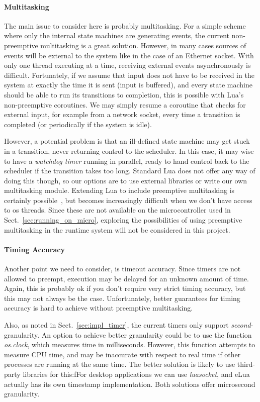 \paragraph{Multitasking} The main issue to consider here is probably multitasking. For a simple scheme where only the internal state machines are generating events, the current non-preemptive multitasking is a great solution. However, in many cases sources of events will be external to the system like in the case of an Ethernet socket. With only one thread executing at a time, receiving external events asynchronously is difficult. Fortunately, if we assume that input does not have to be received in the system at exactly the time it is sent (input is buffered), and every state machine should be able to run its transitions to completion, this is possible with Lua's non-preemptive coroutines. We may simply resume a coroutine that checks for external input, for example from a network socket, every time a transition is completed (or periodically if the system is idle).

However, a potential problem is that an ill-defined state machine may get stuck in a transition, never returning control to the scheduler. In this case, it may wise to have a \emph{watchdog timer} running in parallel, ready to hand control back to the scheduler if the transition takes too long. Standard Lua does not offer any way of doing this though, so our options are to use external libraries or write our own multitasking module. Extending Lua to include preemptive multitasking is certainly possible~\cite{techreport:lua_concurrent}, but becomes increasingly difficult when we don't have access to \gls{os} threads. Since these are not available on the microcontroller used in Sect.~\ref{sec:running_on_micro}, exploring the possibilities of using preemptive multitasking in the runtime system will not be considered in this project.

\paragraph{Timing Accuracy} Another point we need to consider, is timeout accuracy. Since timers are not allowed to preempt, execution may be delayed for an unknown amount of time. Again, this is probably ok if you don't require very strict timing accuracy, but this may not always be the case. Unfortunately, better guarantees for timing accuracy is hard to achieve without preemptive multitasking.

Also, as noted in Sect.~\ref{sec:impl_timer}, the current timers only support \emph{second}-granularity. An option to achieve better granularity could be to use the function \emph{os.clock}, which measures time in milliseconds. However, this function attempts to measure CPU time, and may be inaccurate with respect to real time if other processes are running at the same time. The better solution is likely to use third-party libraries for this:fFor desktop applications we can use \emph{luasocket}, and eLua actually has its own timestamp implementation. Both solutions offer microsecond granularity.

